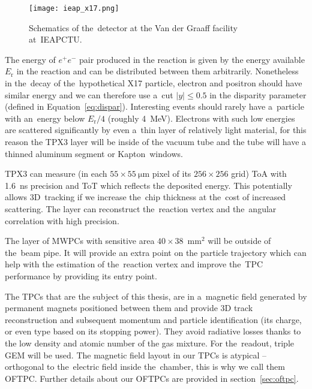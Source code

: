 			\begin{figure}
				\centering
				\texttt{[image: ieap\_x17.png]}
				\caption{Schematics of the~detector at the Van der Graaff facility at~\ac{IEAPCTU}.}
				\label{fig:ieap}
			\end{figure}
		
		The energy of $e^+e^-$ pair produced in the reaction is given by the energy available $E_\text{r}$ in the reaction and can be distributed between them arbitrarily. Nonetheless in the~decay of the~hypothetical X17 particle, electron and positron should have similar energy and we can therefore use a~cut $|y| \leq 0.5$ in the disparity parameter (defined in Equation~\ref{eq:dispar}). Interesting events should rarely have a~particle with an~energy below $E_\text{r}/4$ (roughly 4~MeV). Electrons with such low energies are scattered significantly by even a~thin layer of relatively light material, for this reason the \ac{TPX3} layer will be inside of the vacuum tube and the tube will have a thinned aluminum segment or Kapton\texttrademark\ windows.
		
		\ac{TPX3} can measure (in each $55\times55~\mathrm{\mu m}$ pixel of its $256\times256$ grid) \ac{ToA} with 1.6~ns precision and \ac{ToT} which reflects the deposited energy. This potentially allows 3D~tracking if we increase the~chip thickness at the~cost of increased scattering. The layer can reconstruct the~reaction vertex and the~angular correlation with high precision.
		
		The layer of \acp{MWPC} with sensitive area $40\times38$~mm$^2$ will be outside of the~beam pipe. It will provide an extra point on the particle trajectory which can help with the estimation of the~reaction vertex and improve the~\ac{TPC} performance by providing its entry point.
		
		The \acp{TPC} that are the subject of this thesis, are in a~magnetic field generated by permanent magnets positioned between them and provide 3D track reconstruction and subsequent momentum and particle identification (its charge, or even type based on its stopping power). They avoid radiative losses thanks to the low density and atomic number of the gas mixture. For the~readout, triple \ac{GEM} will be used. The magnetic field layout in our \acp{TPC} is atypical -- orthogonal to the~electric field inside the~chamber, this is why we call them \acf{OFTPC}. Further details about our \acp{OFTPC} are provided in section~\ref{sec:oftpc}.